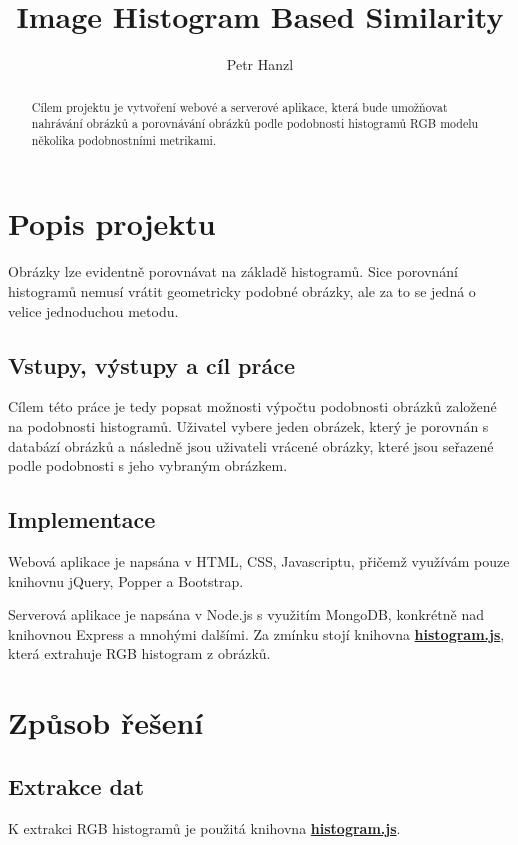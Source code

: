 \documentclass{report}
\title{Image Histogram Based Similarity}
\author{Petr Hanzl}
\begin{document}
 

\maketitle

\tableofcontents

\begin{abstract}
Cílem projektu je vytvoření webové a serverové aplikace, která bude umožňovat nahrávání obrázků a porovnávání obrázků podle podobnosti histogramů RGB modelu několika podobnostními metrikami.  
\end{abstract}


\chapter{Popis projektu}

Obrázky lze evidentně porovnávat na základě histogramů. Sice porovnání histogramů nemusí vrátit geometricky podobné obrázky, ale za to se jedná o velice jednoduchou metodu. 

\section{Vstupy, výstupy a cíl práce}
Cílem této práce je tedy popsat možnosti výpočtu podobnosti obrázků založené na podobnosti histogramů. Uživatel vybere jeden obrázek, který je porovnán s databází obrázků a následně jsou uživateli vrácené obrázky, které jsou seřazené podle podobnosti s jeho vybraným obrázkem.

\section{Implementace}
	Webová aplikace je napsána v HTML, CSS, Javascriptu, přičemž využívám pouze knihovnu jQuery, Popper a Bootstrap.

	Serverová aplikace je napsána v Node.js s využitím MongoDB, konkrétně nad knihovnou Express a mnohými dalšími. Za zmínku stojí knihovna \textbf{\href{https://www.npmjs.com/package/histogram}{histogram.js}}, která extrahuje RGB histogram z obrázků.

\chapter{Způsob řešení}
\section{Extrakce dat}
	K extrakci RGB histogramů je použitá knihovna \textbf{\href{https://www.npmjs.com/package/histogram}{histogram.js}}.
\end{document}
